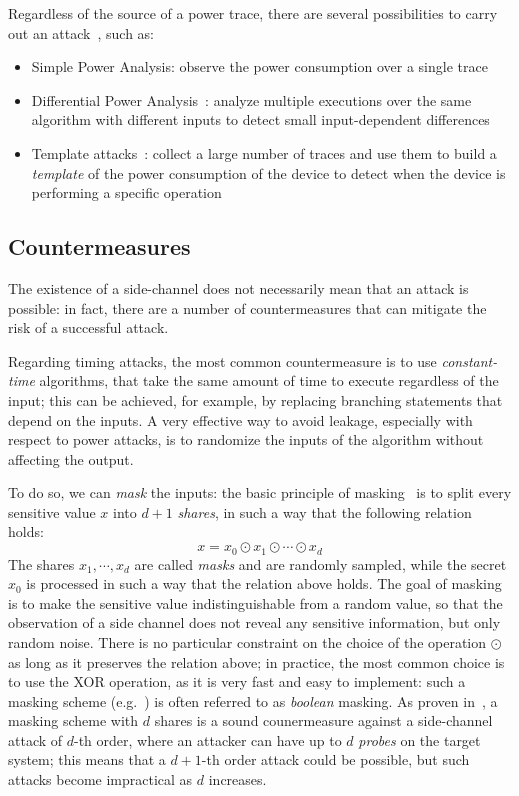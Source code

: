     Regardless of the source of a power trace, there are several possibilities to carry out an attack~\cite{DBLP:journals/cryptography/RandolphD20}, such as:
    \begin{itemize}
        \item Simple Power Analysis: observe the power consumption over a single trace
        \item Differential Power Analysis~\cite{DBLP:conf/crypto/KocherJJ99}: analyze multiple executions over the same algorithm with different inputs to detect small input-dependent differences
        \item Template attacks~\cite{DBLP:conf/ches/ChariRR02}: collect a large number of traces and use them to build a \emph{template} of the power consumption of the device to detect
        when the device is performing a specific operation 
    \end{itemize}

\subsection{Countermeasures}
    The existence of a side-channel does not necessarily mean that an attack is possible: in fact, there are a number of countermeasures
    that can mitigate the risk of a successful attack.

    Regarding timing attacks, the most common countermeasure is to use \emph{constant-time} algorithms, that take the same amount of time to
    execute regardless of the input; this can be achieved, for example, by replacing branching statements that depend on the inputs.
    A very effective way to avoid leakage, especially with respect to power attacks, is to randomize the inputs of the algorithm without
    affecting the output. 
    
    To do so, we can \emph{mask} the inputs: the basic principle of masking~\cite{DBLP:conf/eurocrypt/ProuffR13} is to split every sensitive value $x$ 
    into $d+1$ \textit{shares}, in such a way that the following relation holds:
    \begin{equation}
        x = x_0 \odot x_1 \odot \cdots \odot x_d
    \end{equation}
    The shares $x_1, \cdots, x_d$ are called \textit{masks} and are randomly sampled, while the secret $x_0$ is processed in 
    such a way that the relation above holds. The goal of masking is to make the sensitive value indistinguishable from
    a random value, so that the observation of a side channel does not reveal any sensitive information, but only random noise.
    There is no particular constraint on the choice of the operation $\odot$ as long as it preserves the relation above;
    in practice, the most common choice is to use the XOR operation, as it is very fast and easy to implement: such a masking
    scheme (e.g.~\cite{DBLP:conf/crypto/IshaiSW03}) is often referred to as \emph{boolean} masking.
    As proven in~\cite{DBLP:conf/crypto/ChariJRR99}, a masking scheme with $d$ shares is a sound counermeasure against a side-channel attack 
    of $d$-th order, where an attacker can have up to $d$ \emph{probes} on the target system; this means that a $d+1$-th order
    attack could be possible, but such attacks become impractical as $d$ increases.

